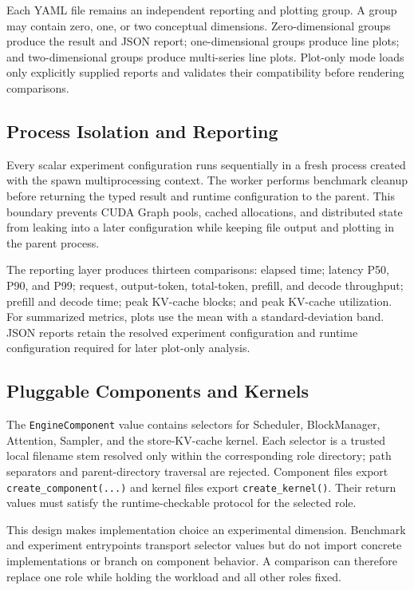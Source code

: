 \documentclass[conference]{IEEEtran}
\begin{document}
Each YAML file remains an independent reporting and plotting group. A group
may contain zero, one, or two conceptual dimensions. Zero-dimensional groups
produce the result and JSON report; one-dimensional groups produce line plots;
and two-dimensional groups produce multi-series line plots. Plot-only mode
loads only explicitly supplied reports and validates their compatibility
before rendering comparisons.

\subsection{Process Isolation and Reporting}

Every scalar experiment configuration runs sequentially in a fresh process
created with the spawn multiprocessing context. The worker performs benchmark
cleanup before returning the typed result and runtime configuration to the
parent. This boundary prevents CUDA Graph pools, cached allocations, and
distributed state from leaking into a later configuration while keeping file
output and plotting in the parent process.

The reporting layer produces thirteen comparisons: elapsed time; latency P50,
P90, and P99; request, output-token, total-token, prefill, and decode
throughput; prefill and decode time; peak KV-cache blocks; and peak KV-cache
utilization. For summarized metrics, plots use the mean with a
standard-deviation band. JSON reports retain the resolved experiment
configuration and runtime configuration required for later plot-only analysis.

\subsection{Pluggable Components and Kernels}

The \texttt{EngineComponent} value contains selectors for Scheduler,
BlockManager, Attention, Sampler, and the store-KV-cache kernel. Each selector
is a trusted local filename stem resolved only within the corresponding role
directory; path separators and parent-directory traversal are rejected.
Component files export \texttt{create\_component(...)} and kernel files export
\texttt{create\_kernel()}. Their return values must satisfy the
runtime-checkable protocol for the selected role.

This design makes implementation choice an experimental dimension. Benchmark
and experiment entrypoints transport selector values but do not import
concrete implementations or branch on component behavior. A comparison can
therefore replace one role while holding the workload and all other roles
fixed.
\end{document}
